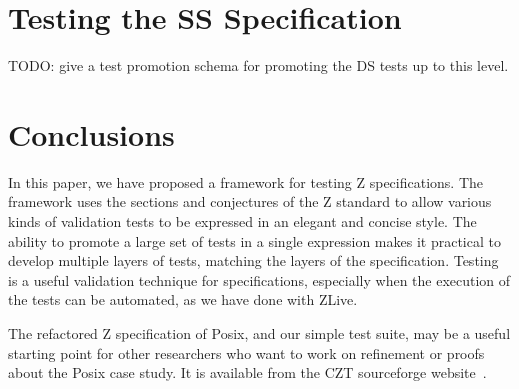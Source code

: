\documentclass{llncs}
\begin{document}



\section{Testing the SS Specification}\label{sect:ss}

TODO: give a test promotion schema for promoting the DS tests up to this
level.


\section{Conclusions}\label{sect:conclusions}

In this paper, we have proposed a framework for testing Z
specifications.  The framework uses the sections and conjectures of
the Z standard to allow various kinds of validation tests to be
expressed in an elegant and concise style.  The ability to promote a
large set of tests in a single expression makes it practical to
develop multiple layers of tests, matching the layers of the
specification.  Testing is a useful validation technique for
specifications, especially when the execution of the tests can be
automated, as we have done with ZLive.

The refactored Z specification of Posix, and our simple test suite,
may be a useful starting point
for other researchers who want to work on refinement or proofs
about the Posix case study.  It is available from the CZT sourceforge
website~\cite{CZT}.


%
%


%
\end{document}
